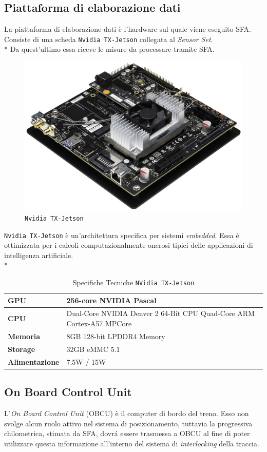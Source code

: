 \subsection{Piattaforma di elaborazione dati}
La piattaforma di elaborazione dati \`e l'hardware sul quale viene eseguito SFA.
Consiste di una scheda \texttt{Nvidia TX-Jetson} collegata al \emph{Sensor Set}.\\*
Da quest'ultimo essa riceve le misure da processare tramite SFA.
\begin{figure}[h]
		\centering
		\includegraphics[width=0.7\linewidth]{img/nvidia}
		\caption{\texttt{Nvidia TX-Jetson}}
		\label{fig:nvidia}
\end{figure}
\texttt{Nvidia TX-Jetson} \`e un'architettura specifica per sistemi \emph{embedded}. Essa \`e ottimizzata per i calcoli computazionalmente onerosi tipici delle applicazioni di intelligenza artificiale.\cite{nvidia}\\*
\begin{table}[h]
\begin{tabular}{|p{3cm}|p{8cm}|}
	\hline 
	\textbf{GPU} & 256-core NVIDIA Pascal\\ 
	\hline 
	\textbf{CPU} & Dual-Core NVIDIA Denver 2 64-Bit CPU Quad-Core ARM Cortex-A57 MPCore \\ 
	\hline 
	\textbf{Memoria} & 8GB 128-bit LPDDR4 Memory \\ 
	\hline 
	\textbf{Storage} & 32GB eMMC 5.1 \\ 
	\hline 
	\textbf{Alimentazione} & 7.5W / 15W \\ 
	\hline 
\end{tabular}
\caption{Specifiche Tecniche \texttt{NVidia TX-Jetson}}
\label{tab:nvidia}
\end{table}
\subsection{On Board Control Unit}
L'\emph{On Board Control Unit} (OBCU) \`e il computer di bordo del treno. Esso non svolge alcun ruolo attivo nel sistema di posizionamento, tuttavia la progressiva chilometrica, stimata da SFA, dovr\'a essere trasmessa a OBCU al fine di poter utilizzare questa informazione all'interno del sistema di \emph{interlocking} della traccia.
